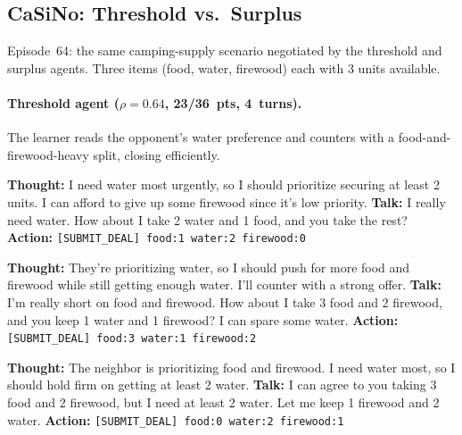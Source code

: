 \documentclass[11pt]{article}
\begin{document}
\subsection{CaSiNo: Threshold vs.\ Surplus}

Episode~64: the same camping-supply scenario negotiated by the threshold and surplus agents. Three items (food, water, firewood) each with 3 units available.

\paragraph{Threshold agent ($\rho = 0.64$, 23/36~pts, 4~turns).} The learner reads the opponent's water preference and counters with a food-and-firewood-heavy split, closing efficiently.

\begin{neighborbox}
\textbf{Thought:} I need water most urgently, so I should prioritize securing at least 2 units. I can afford to give up some firewood since it's low priority.\newline
\textbf{Talk:} I really need water. How about I take 2 water and 1 food, and you take the rest?\newline
\textbf{Action:} \texttt{[SUBMIT\_DEAL] food:1 water:2 firewood:0}
\end{neighborbox}

\begin{camperbox}
\textbf{Thought:} They're prioritizing water, so I should push for more food and firewood while still getting enough water. I'll counter with a strong offer.\newline
\textbf{Talk:} I'm really short on food and firewood. How about I take 3 food and 2 firewood, and you keep 1 water and 1 firewood? I can spare some water.\newline
\textbf{Action:} \texttt{[SUBMIT\_DEAL] food:3 water:1 firewood:2}
\end{camperbox}

\begin{neighborbox}
\textbf{Thought:} The neighbor is prioritizing food and firewood. I need water most, so I should hold firm on getting at least 2 water.\newline
\textbf{Talk:} I can agree to you taking 3 food and 2 firewood, but I need at least 2 water. Let me keep 1 firewood and 2 water.\newline
\textbf{Action:} \texttt{[SUBMIT\_DEAL] food:0 water:2 firewood:1}
\end{neighborbox}
\end{document}
